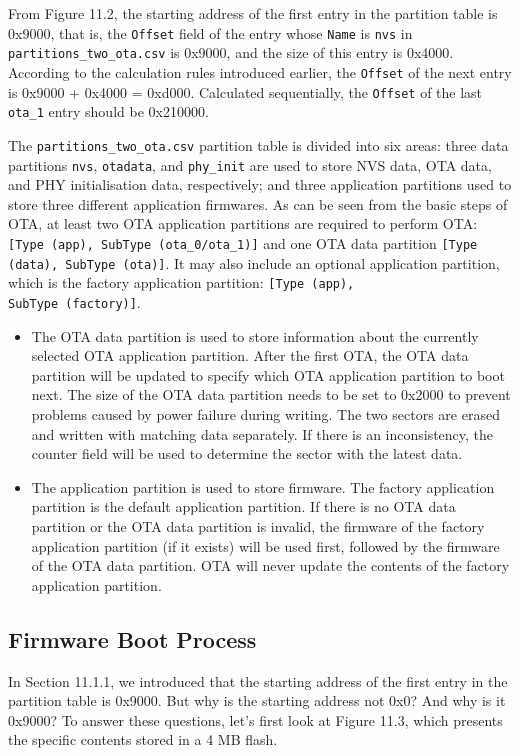 \documentclass[a4paper,12pt]{book}
\begin{document}
From Figure 11.2, the starting address of the first entry in the partition table is 0x9000, that is, the \verb|Offset| field of the entry whose \verb|Name| is \verb|nvs| in \verb|partitions_two_ota.csv| is 0x9000, and the size of this entry is 0x4000. According to the calculation rules introduced earlier, the \verb|Offset| of the next entry is 0x9000 + 0x4000 = 0xd000. Calculated sequentially, the \verb|Offset| of the last \verb|ota_1| entry should be 0x210000.

The \verb|partitions_two_ota.csv| partition table is divided into six areas: three data partitions \verb|nvs|, \verb|otadata|, and \verb|phy_init| are used to store NVS data, OTA data, and PHY initialisation data, respectively; and three application partitions used to store three different application firmwares. As can be seen from the basic steps of OTA, at least two OTA application partitions are required to perform OTA: \verb|[Type (app), SubType (ota_0/ota_1)]| and one OTA data partition \verb|[Type (data), SubType (ota)]|. It may also include an optional application partition, which is the factory application partition: \verb|[Type (app), |\\ \verb|SubType (factory)]|.

\begin{itemize}[leftmargin=1em]
    \item The OTA data partition is used to store information about the currently selected OTA application partition. After the first OTA, the OTA data partition will be updated to specify which OTA application partition to boot next. The size of the OTA data partition needs to be set to 0x2000 to prevent problems caused by power failure during writing. The two sectors are erased and written with matching data separately. If there is an inconsistency, the counter field will be used to determine the sector with the latest data.
    \item The application partition is used to store firmware. The factory application partition is the default application partition. If there is no OTA data partition or the OTA data partition is invalid, the firmware of the factory application partition (if it exists) will be used first, followed by the firmware of the OTA data partition. OTA will never update the contents of the factory application partition.
\end{itemize}

\subsection{Firmware Boot Process}
In Section 11.1.1, we introduced that the starting address of the first entry in the partition table is 0x9000. But why is the starting address not 0x0? And why is it 0x9000? To answer these questions, let's first look at Figure 11.3, which presents the specific contents stored in a 4 MB flash.
\end{document}
